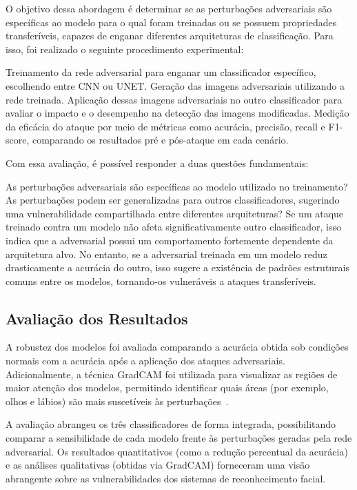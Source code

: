 \documentclass[12pt]{article}
\begin{document}
O objetivo dessa abordagem é determinar se as perturbações adversariais são
específicas ao modelo para o qual foram treinadas ou se possuem propriedades
transferíveis, capazes de enganar diferentes arquiteturas de classificação.
Para isso, foi realizado o seguinte procedimento experimental:

Treinamento da rede adversarial para enganar um classificador específico,
escolhendo entre CNN ou UNET. Geração das imagens adversariais utilizando a
rede treinada. Aplicação dessas imagens adversariais no outro classificador
para avaliar o impacto e o desempenho na detecção das imagens modificadas.
Medição da eficácia do ataque por meio de métricas como acurácia, precisão,
recall e F1-score, comparando os resultados pré e pós-ataque em cada cenário.

Com essa avaliação, é possível responder a duas questões fundamentais:

As perturbações adversariais são específicas ao modelo utilizado no
treinamento? As perturbações podem ser generalizadas para outros
classificadores, sugerindo uma vulnerabilidade compartilhada entre diferentes
arquiteturas? Se um ataque treinado contra um modelo não afeta
significativamente outro classificador, isso indica que a adversarial possui um
comportamento fortemente dependente da arquitetura alvo. No entanto, se a
adversarial treinada em um modelo reduz drasticamente a acurácia do outro, isso
sugere a existência de padrões estruturais comuns entre os modelos, tornando-os
vulneráveis a ataques transferíveis.

\subsection{Avaliação dos Resultados}

A robustez dos modelos foi avaliada comparando a acurácia obtida sob condições
normais com a acurácia após a aplicação dos ataques adversariais.
Adicionalmente, a técnica GradCAM foi utilizada para visualizar as regiões de
maior atenção dos modelos, permitindo identificar quais áreas (por exemplo,
olhos e lábios) são mais suscetíveis às
perturbações~\cite{selvaraju2017gradcam}.

A avaliação abrangeu os três classificadores de forma integrada, possibilitando
comparar a sensibilidade de cada modelo frente às perturbações geradas pela
rede adversarial. Os resultados quantitativos (como a redução percentual da
acurácia) e as análises qualitativas (obtidas via GradCAM) forneceram uma visão
abrangente sobre as vulnerabilidades dos sistemas de reconhecimento facial.
\end{document}
